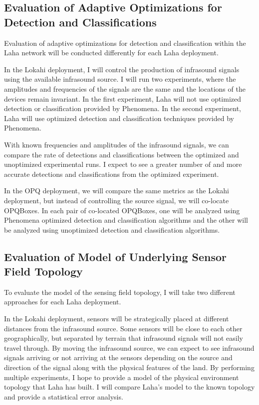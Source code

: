 \subsection{Evaluation of Adaptive Optimizations for Detection and Classifications}
Evaluation of adaptive optimizations for detection and classification within the Laha network will be conducted differently for each Laha deployment.

In the Lokahi deployment, I will control the production of infrasound signals using the available infrasound source. I will run two experiments, where the amplitudes and frequencies of the signals are the same and the locations of the devices remain invariant. In the first experiment, Laha will not use optimized detection or classification provided by Phenomena. In the second experiment, Laha will use optimized detection and classification techniques provided by Phenomena. 

With known frequencies and amplitudes of the infrasound signals, we can compare the rate of detections and classifications between the optimized and unoptimized experimental runs. I expect to see a greater number of and more accurate detections and classifications from the optimized experiment.

In the OPQ deployment, we will compare the same metrics as the Lokahi deployment, but instead of controlling the source signal, we will co-locate OPQBoxes. In each pair of co-located OPQBoxes, one will be analyzed using Phenomena optimized detection and classification algorithms and the other will be analyzed using unoptimized detection and classification algorithms.

\subsection{Evaluation of Model of Underlying Sensor Field Topology}
To evaluate the model of the sensing field topology, I will take two different approaches for each Laha deployment.

In the Lokahi deployment, sensors will be strategically placed at different distances from the infrasound source. Some sensors will be close to each other geographically, but separated by terrain that infrasound signals will not easily travel through. By moving the infrasound source, we can expect to see infrasound signals arriving or not arriving at the sensors depending on the source and direction of the signal along with the physical features of the land. By performing multiple experiments, I hope to provide a model of the physical environment topology that Laha has built. I will compare Laha's model to the known topology and provide a statistical error analysis. 


